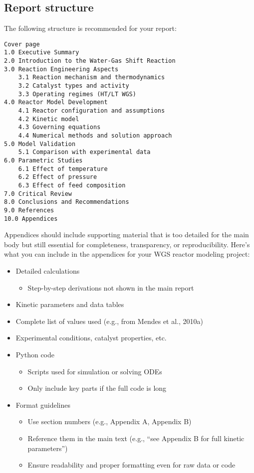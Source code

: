 \documentclass[
  12pt,
  a4paperpaper,
  DIV=11,
  numbers=noendperiod]{scrartcl}
\providecommand{\tightlist}{%
  \setlength{\itemsep}{0pt}\setlength{\parskip}{0pt}}\usepackage{longtable,booktabs,array}
\begin{document}
\subsection{Report structure}\label{report-structure}

The following structure is recommended for your report:

\begin{verbatim}
Cover page
1.0 Executive Summary
2.0 Introduction to the Water-Gas Shift Reaction
3.0 Reaction Engineering Aspects
    3.1 Reaction mechanism and thermodynamics
    3.2 Catalyst types and activity
    3.3 Operating regimes (HT/LT WGS)
4.0 Reactor Model Development
    4.1 Reactor configuration and assumptions
    4.2 Kinetic model
    4.3 Governing equations
    4.4 Numerical methods and solution approach
5.0 Model Validation
    5.1 Comparison with experimental data
6.0 Parametric Studies
    6.1 Effect of temperature
    6.2 Effect of pressure
    6.3 Effect of feed composition
7.0 Critical Review
8.0 Conclusions and Recommendations
9.0 References
10.0 Appendices
\end{verbatim}

Appendices should include supporting material that is too detailed for
the main body but still essential for completeness, transparency, or
reproducibility. Here's what you can include in the appendices for your
WGS reactor modeling project:

\begin{itemize}
\item
  Detailed calculations

  \begin{itemize}
  \tightlist
  \item
    Step-by-step derivations not shown in the main report
  \end{itemize}
\item
  Kinetic parameters and data tables
\item
  Complete list of values used (e.g., from Mendes et al., 2010a)
\item
  Experimental conditions, catalyst properties, etc.
\item
  Python code

  \begin{itemize}
  \tightlist
  \item
    Scripts used for simulation or solving ODEs
  \item
    Only include key parts if the full code is long
  \end{itemize}
\item
  Format guidelines

  \begin{itemize}
  \tightlist
  \item
    Use section numbers (e.g., Appendix A, Appendix B)
  \item
    Reference them in the main text (e.g., ``see Appendix B for full
    kinetic parameters'')
  \item
    Ensure readability and proper formatting even for raw data or code
  \end{itemize}
\end{itemize}
\end{document}
